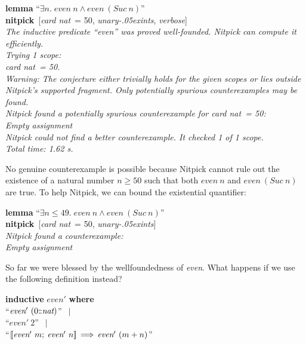 \documentclass[a4paper,12pt]{article}
\def\Colon{\mathord{:\mkern-1.5mu:}}
\renewcommand\_{\hbox{\textunderscore\kern-.05ex}}
\begin{document}
\prew
\textbf{lemma} ``$\exists n.\; \textit{even}~n \mathrel{\land} \textit{even}~(\textit{Suc}~n)$'' \\
\textbf{nitpick}~[\textit{card nat}~= 50, \textit{unary\_ints}, \textit{verbose}] \\[2\smallskipamount]
\slshape The inductive predicate ``\textit{even}'' was proved well-founded.
Nitpick can compute it efficiently. \\[2\smallskipamount]
Trying 1 scope: \\
\hbox{}\qquad \textit{card nat}~= 50. \\[2\smallskipamount]
Warning: The conjecture either trivially holds for the given scopes or lies outside Nitpick's supported fragment. Only
potentially spurious counterexamples may be found. \\[2\smallskipamount]
Nitpick found a potentially spurious counterexample for \textit{card nat}~= 50: \\[2\smallskipamount]
\hbox{}\qquad Empty assignment \\[2\smallskipamount]
Nitpick could not find a better counterexample. It checked 1 of 1 scope. \\[2\smallskipamount]
Total time: 1.62 s.
\postw

No genuine counterexample is possible because Nitpick cannot rule out the
existence of a natural number $n \ge 50$ such that both $\textit{even}~n$ and
$\textit{even}~(\textit{Suc}~n)$ are true. To help Nitpick, we can bound the
existential quantifier:

\prew
\textbf{lemma} ``$\exists n \mathbin{\le} 49.\; \textit{even}~n \mathrel{\land} \textit{even}~(\textit{Suc}~n)$'' \\
\textbf{nitpick}~[\textit{card nat}~= 50, \textit{unary\_ints}] \\[2\smallskipamount]
\slshape Nitpick found a counterexample: \\[2\smallskipamount]
\hbox{}\qquad Empty assignment
\postw

So far we were blessed by the wellfoundedness of \textit{even}. What happens if
we use the following definition instead?

\prew
\textbf{inductive} $\textit{even}'$ \textbf{where} \\
``$\textit{even}'~(0{\Colon}\textit{nat})$'' $\,\mid$ \\
``$\textit{even}'~2$'' $\,\mid$ \\
``$\mathopen{[\![}\textit{even}'~m;\> \textit{even}'~n\mathclose{]\!]} \,\Longrightarrow\, \textit{even}'~(m + n)$''
\postw
\end{document}
